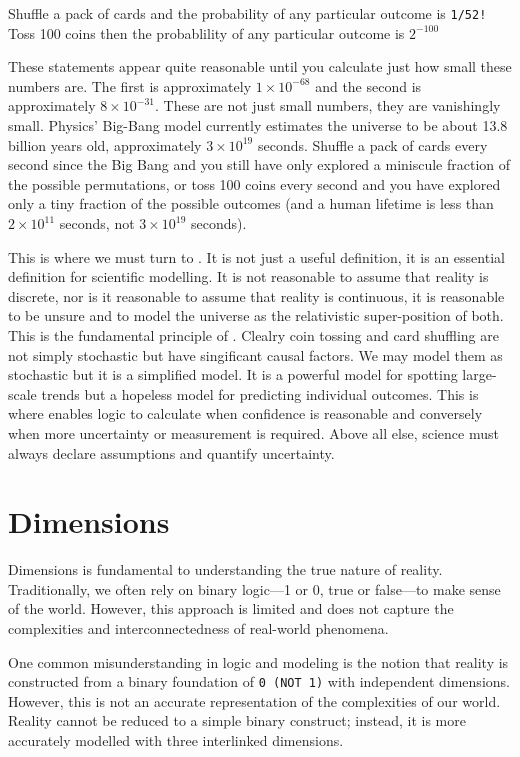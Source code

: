 \documentclass[12pt]{article}
\begin{document}
Shuffle a pack of cards and the probability of any particular outcome is \texttt{1/52!}
Toss 100 coins then the probablility of any particular outcome is $2^{-100}$

These statements appear quite reasonable until you calculate just how small these numbers are. The first is approximately $1 \times 10^{-68}$ and the second is approximately $8 \times 10^{-31}$. These are not just small numbers, they are vanishingly small. Physics' Big-Bang model currently estimates the universe to be about 13.8 billion years old, approximately $3 \times 10^{19}$ seconds. Shuffle a pack of cards every second since the Big Bang and you still have only explored a miniscule fraction of the possible permutations, or toss 100 coins every second and you have explored only a tiny fraction of the possible outcomes (and a human lifetime is less than $2 \times 10^{11}$ seconds, not $3 \times 10^{19}$ seconds).

This is where we must turn to \qbit{}. It is not just a useful definition, it is an essential definition for scientific modelling. It is not reasonable to assume that reality is discrete, nor is it reasonable to assume that reality is continuous, it is reasonable to be unsure and to model the universe as the relativistic super-position of both. This is the fundamental principle of \iR{}. Clealry coin tossing and card shuffling are not simply stochastic but have singificant causal factors. We may model them as stochastic but it is a simplified model. It is a powerful model for spotting large-scale trends but a hopeless model for predicting individual outcomes. This is where \qbit{} enables logic to calculate when confidence is reasonable and conversely when more uncertainty or measurement is required. Above all else, science must always declare assumptions and quantify uncertainty.

\section*{\iR{} Dimensions}

\iR{} Dimensions is fundamental to understanding the true nature of reality. Traditionally, we often rely on binary logic—1 or 0, true or false—to make sense of the world. However, this approach is limited and does not capture the complexities and interconnectedness of real-world phenomena.

One common misunderstanding in logic and modeling is the notion that reality is constructed from a binary foundation of \texttt{0 (NOT 1)} with independent dimensions. However, this is not an accurate representation of the complexities of our world. Reality cannot be reduced to a simple binary construct; instead, it is more accurately modelled with three interlinked dimensions.
\end{document}
